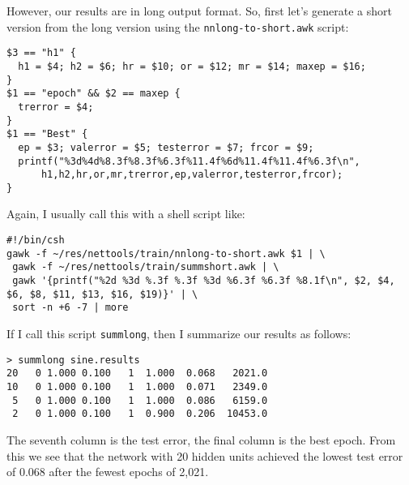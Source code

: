 However, our results are in long output format.  So, first let's generate a
 short version from the long version using the \verb'nnlong-to-short.awk' script:
\begin{small}
\begin{verbatim}
$3 == "h1" {
  h1 = $4; h2 = $6; hr = $10; or = $12; mr = $14; maxep = $16;
}
$1 == "epoch" && $2 == maxep {
  trerror = $4;
}
$1 == "Best" {
  ep = $3; valerror = $5; testerror = $7; frcor = $9;
  printf("%3d%4d%8.3f%8.3f%6.3f%11.4f%6d%11.4f%11.4f%6.3f\n",
	  h1,h2,hr,or,mr,trerror,ep,valerror,testerror,frcor);
}
\end{verbatim}
\end{small}
Again, I usually call this with a shell script like:
\begin{small}
\begin{verbatim}
#!/bin/csh
gawk -f ~/res/nettools/train/nnlong-to-short.awk $1 | \
 gawk -f ~/res/nettools/train/summshort.awk | \
 gawk '{printf("%2d %3d %.3f %.3f %3d %6.3f %6.3f %8.1f\n", $2, $4, $6, $8, $11, $13, $16, $19)}' | \
 sort -n +6 -7 | more
\end{verbatim}
\end{small}
If I call this script \verb'summlong', then I summarize our results as follows:
\begin{verbatim}
> summlong sine.results
20   0 1.000 0.100   1  1.000  0.068   2021.0
10   0 1.000 0.100   1  1.000  0.071   2349.0
 5   0 1.000 0.100   1  1.000  0.086   6159.0
 2   0 1.000 0.100   1  0.900  0.206  10453.0
\end{verbatim}
The seventh column is the test error, the final column is the best epoch.
From this we see that the network with 20 hidden units achieved the lowest
test error of 0.068 after the fewest epochs of 2,021.

